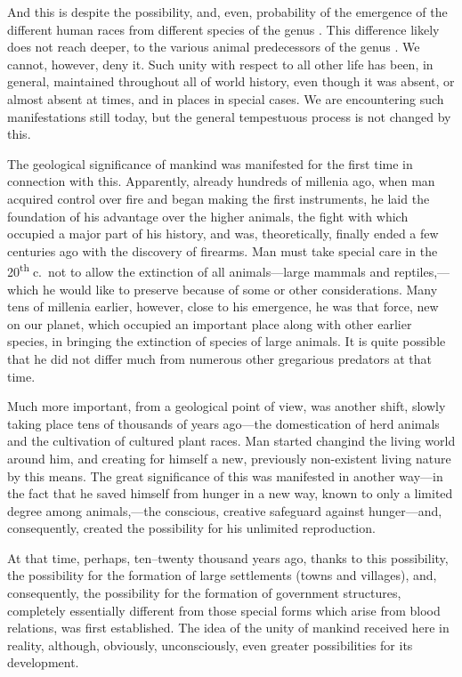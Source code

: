 And this is despite the possibility, and, even, probability of the emergence of
the different human races from different species of the genus .
This difference likely does not reach deeper, to the various animal
predecessors of the genus .  We cannot, however, deny it.  Such
unity with respect to all other life has been, in general, maintained
throughout all of world history, even though it was absent, or almost absent at
times, and in places in special cases.  We are encountering such manifestations
still today, but the general tempestuous process is not changed by this.

The geological significance of mankind was manifested for the first time in
connection with this.  Apparently, already hundreds of millenia ago, when man
acquired control over fire and began making the first instruments, he laid the
foundation of his advantage over the higher animals, the fight with which
occupied a major part of his history, and was, theoretically, finally ended a
few centuries ago with the discovery of firearms.  Man must take special care
in the 20\textsuperscript{th}$\;$c.\ not to allow the extinction of all
animals---large mammals and reptiles,---which he would like to preserve because
of some or other considerations.  Many tens of millenia earlier, however, close
to his emergence, he was that force, new on our planet, which occupied an
important place along with other earlier species, in bringing the extinction of
species of large animals.  It is quite possible that he did not differ much
from numerous other gregarious predators at that time.


\Section %
Much more important, from a geological point of view, was another shift, slowly
taking place tens of thousands of years ago---the domestication of herd animals
and the cultivation of cultured plant races.  Man started changind the living
world around him, and creating for himself a new, previously non-existent
living nature by this means.  The great significance of this was manifested in
another way---in the fact that he saved himself from hunger in a new way, known
to only a limited degree among animals,---the conscious, creative safeguard
against hunger---and, consequently, created the possibility for his unlimited
reproduction.

At that time, perhaps, ten--twenty thousand years ago, thanks to this
possibility, the possibility for the formation of large settlements (towns and
villages), and, consequently, the possibility for the formation of government
structures, completely essentially different from those special forms which
arise from blood relations, was first established.  The idea of the unity of
mankind received here in reality, although, obviously, unconsciously, even
greater possibilities for its development.

